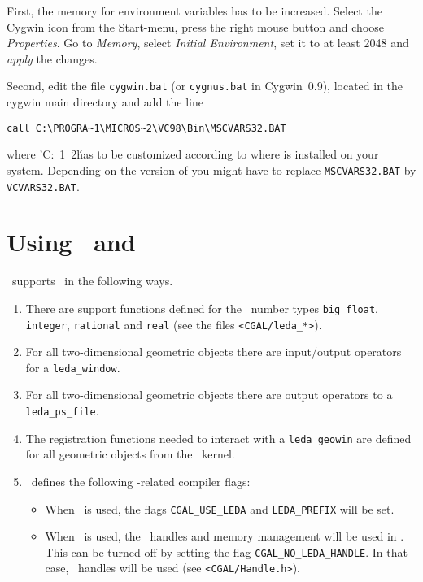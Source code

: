 First, the memory for environment variables has to be increased.
Select the Cygwin icon from the Start-menu, press the right mouse
button and choose \textit{Properties}. Go to \textit{Memory}, select
\textit{Initial Environment}, set it to at least 2048 and
\textit{apply} the changes.

Second, edit the file \texttt{cygwin.bat} (or \texttt{cygnus.bat} in
Cygwin~0.9), located in the cygwin main directory and add the line
\begin{verbatim}
call C:\PROGRA~1\MICROS~2\VC98\Bin\MSCVARS32.BAT
\end{verbatim}
where
\nonlinkedpath'C:\PROGRA~1\MICROS~2\'
has to be customized according to where \msvc{} is installed on your
system. Depending on the version of \msvc{} you might have to replace
\texttt{MSCVARS32.BAT} by \texttt{VCVARS32.BAT}.

\lcTex{\begin{appendix}}

\section{Using \cgal\ and \leda}\label{sec:leda}
\cgal\ supports \leda\ in the following ways.

\begin{enumerate}
\item There are support functions defined for the \leda\ number types
  \texttt{big\_float}, \texttt{integer}, \texttt{rational} and
  \texttt{real} (see the files \texttt{<CGAL/leda\_*>}).
\item For all two-dimensional geometric objects there are input/output
  operators for a \texttt{leda\_window}.
\item For all two-dimensional geometric objects there are output
  operators to a \texttt{leda\_ps\_file}.
\item The registration functions needed to interact with a
  \texttt{leda\_geowin} are defined for all geometric objects from the
  \cgal\ kernel.
\item \cgal\ defines the following \leda-related compiler flags:
\begin{itemize}
\item When \leda\ is used, the flags \texttt{CGAL\_USE\_LEDA} and
  \texttt{LEDA\_PREFIX} will be set.
\item When \leda\ is used, the \leda\ handles and memory management
  will be used in \cgal.  This can be turned off by setting the flag
  \texttt{CGAL\_NO\_LEDA\_HANDLE}. In that case, \cgal\ handles will
  be used (see \texttt{<CGAL/Handle.h>}).
\end{itemize}
\end{enumerate}

